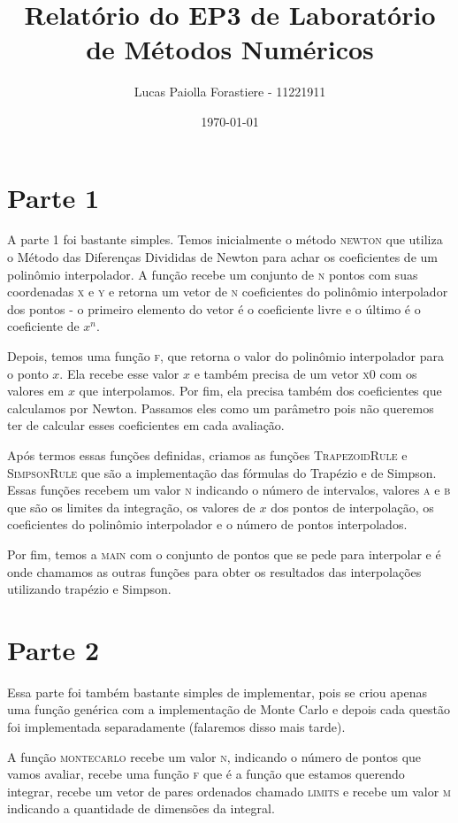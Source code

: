 \documentclass[12pt, a4paper, oneside]{article}
\title{Relatório do EP3 de Laboratório de Métodos Numéricos}
\date{\today}
\author{Lucas Paiolla Forastiere - 11221911}
\begin{document}
\maketitle

\section*{Parte 1}

A parte 1 foi bastante simples. Temos inicialmente o método \textsc{newton} 
que utiliza o Método das Diferenças Divididas de Newton para achar os coeficientes
de um polinômio interpolador. A função recebe um conjunto de \textsc{n} pontos
com suas coordenadas \textsc{x} e \textsc{y} e retorna um vetor de \textsc{n}
coeficientes do polinômio interpolador dos pontos - o primeiro elemento do vetor 
é o coeficiente livre e o último é o coeficiente de $x^n$.

Depois, temos uma função \textsc{f}, que retorna o valor do polinômio interpolador
para o ponto $x$. Ela recebe esse valor $x$ e também precisa de um vetor 
\textsc{x0} com os valores em $x$ que interpolamos. Por fim, ela precisa também 
dos coeficientes que calculamos por Newton. Passamos eles como um parâmetro pois
não queremos ter de calcular esses coeficientes em cada avaliação.

Após termos essas funções definidas, criamos as funções \textsc{TrapezoidRule} e\nl
\textsc{SimpsonRule} que são a implementação das fórmulas do Trapézio e de 
Simpson. Essas funções recebem um valor \textsc{n} indicando o número de intervalos,
valores \textsc{a} e \textsc{b} que são os limites da integração, os valores 
de $x$ dos pontos de interpolação, os coeficientes do polinômio interpolador e
o número de pontos interpolados.

Por fim, temos a \textsc{main} com o conjunto de pontos que se pede para interpolar
e é onde chamamos as outras funções para obter os resultados das interpolações
utilizando trapézio e Simpson.

\section*{Parte 2}

Essa parte foi também bastante simples de implementar, pois se criou apenas uma
função genérica com a implementação de Monte Carlo e depois cada questão foi 
implementada separadamente (falaremos disso mais tarde).

A função \textsc{montecarlo} recebe um valor \textsc{n}, indicando o número de pontos 
que vamos avaliar, recebe uma função \textsc{f} que é a função que estamos 
querendo integrar, recebe um vetor de pares ordenados chamado \textsc{limits} e 
recebe um valor \textsc{m} indicando a quantidade de dimensões da integral.
\end{document}
